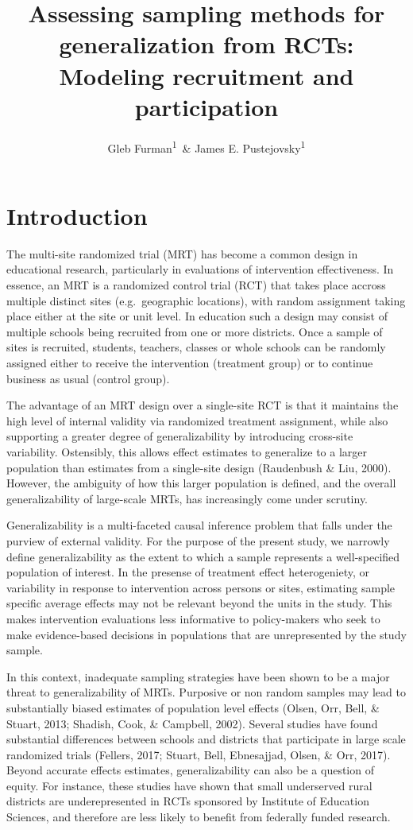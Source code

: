 \documentclass[man,floatsintext]{apa6}
\title{Assessing sampling methods for generalization from RCTs: Modeling recruitment and participation}
\author{Gleb Furman\textsuperscript{1}~\& James E. Pustejovsky\textsuperscript{1}}
\date{}
\affiliation{
\vspace{0.5cm}
\textsuperscript{1} University of Texas at Austin}
\begin{document}
\maketitle

\hypertarget{introduction}{%
\section{Introduction}\label{introduction}}

The multi-site randomized trial (MRT) has become a common design in educational research, particularly in evaluations of intervention effectiveness. In essence, an MRT is a randomized control trial (RCT) that takes place accross multiple distinct sites (e.g.~geographic locations), with random assignment taking place either at the site or unit level. In education such a design may consist of multiple schools being recruited from one or more districts. Once a sample of sites is recruited, students, teachers, classes or whole schools can be randomly assigned either to receive the intervention (treatment group) or to continue business as usual (control group).

The advantage of an MRT design over a single-site RCT is that it maintains the high level of internal validity via randomized treatment assignment, while also supporting a greater degree of generalizability by introducing cross-site variability. Ostensibly, this allows effect estimates to generalize to a larger population than estimates from a single-site design (Raudenbush \& Liu, 2000). However, the ambiguity of how this larger population is defined, and the overall generalizability of large-scale MRTs, has increasingly come under scrutiny.

Generalizability is a multi-faceted causal inference problem that falls under the purview of external validity. For the purpose of the present study, we narrowly define generalizability as the extent to which a sample represents a well-specified population of interest. In the presense of treatment effect heterogeniety, or variability in response to intervention across persons or sites, estimating sample specific average effects may not be relevant beyond the units in the study. This makes intervention evaluations less informative to policy-makers who seek to make evidence-based decisions in populations that are unrepresented by the study sample.

In this context, inadequate sampling strategies have been shown to be a major threat to generalizability of MRTs. Purposive or non random samples may lead to substantially biased estimates of population level effects (Olsen, Orr, Bell, \& Stuart, 2013; Shadish, Cook, \& Campbell, 2002). Several studies have found substantial differences between schools and districts that participate in large scale randomized trials (Fellers, 2017; Stuart, Bell, Ebnesajjad, Olsen, \& Orr, 2017). Beyond accurate effects estimates, generalizability can also be a question of equity. For instance, these studies have shown that small underserved rural districts are underepresented in RCTs sponsored by Institute of Education Sciences, and therefore are less likely to benefit from federally funded research.
\end{document}
